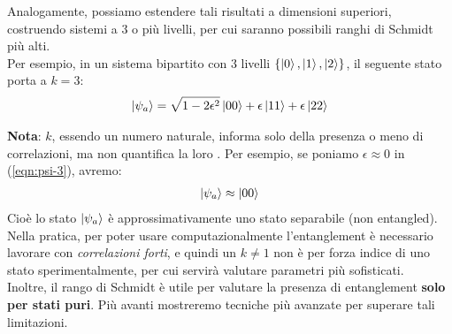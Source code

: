 \documentclass[../../InformazioneQuantistica.tex]{subfiles}
\begin{document}
Analogamente, possiamo estendere tali risultati a dimensioni superiori, costruendo sistemi a $3$ o più livelli, per cui saranno possibili ranghi di Schmidt più alti.\\
Per esempio, in un sistema bipartito con $3$ livelli $\{\Ket{0}, \Ket{1}, \Ket{2}\}$, il seguente stato porta a $k=3$:
\begin{align}
\Ket{\psi_a}= \sqrt{1-2\epsilon^2} \Ket{00} + \epsilon \Ket{11} + \epsilon\Ket{22}
\label{eqn:psi-3}
\end{align}

\textbf{Nota}: $k$, essendo un numero naturale, informa solo della presenza o meno di correlazioni, ma non quantifica la loro . Per esempio, se poniamo $\epsilon \approx 0$ in (\ref{eqn:psi-3}), avremo:
\begin{align*}
\Ket{\psi_a}\approx \Ket{00}
\end{align*}
Cioè lo stato $\Ket{\psi_a}$ è approssimativamente uno stato separabile (non entangled).\\
Nella pratica, per poter usare computazionalmente l'entanglement è necessario lavorare con \textit{correlazioni forti}, e quindi un $k\neq 1$ non è per forza indice di uno stato  sperimentalmente, per cui servirà valutare parametri più sofisticati.\\
Inoltre, il rango di Schmidt è utile per valutare la presenza di entanglement \textbf{solo per stati puri}. Più avanti mostreremo tecniche più avanzate per superare tali limitazioni.

\begin{comment}
\begin{table}
\centering
\begin{tabular}{| c | c | >{\centering}m{5cm} |} \toprule
\textbf{Simbolo} & & \textbf{Significato}\\ \midrule
\reddot & Modello di Bohr & Appunti in versione \textit{raw},
\end{tabular}
\end{table}
\end{comment}
\end{document}
